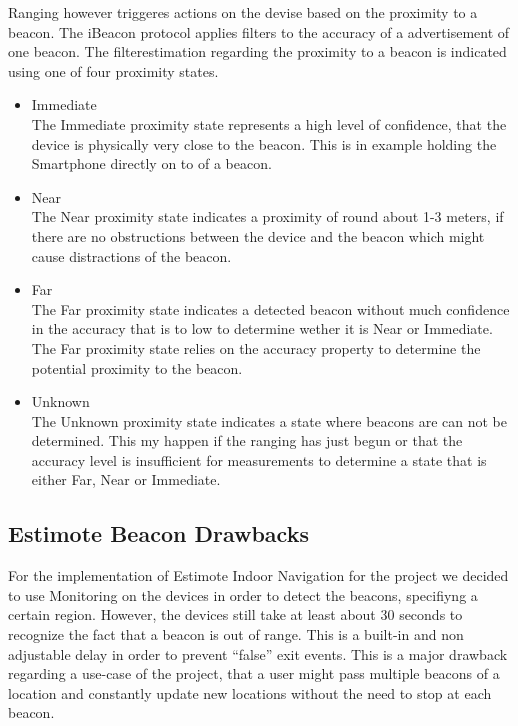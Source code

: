 Ranging however triggeres actions on the devise based on the proximity to a beacon.
The iBeacon protocol applies filters to the accuracy of a advertisement of one beacon. The filterestimation regarding the proximity to a beacon is indicated using one of four proximity states.

\begin{itemize}

    \item Immediate\\
    The Immediate proximity state represents a high level of confidence, that the device is physically very close to the beacon. This is in example holding the Smartphone directly on to of a beacon.
    \item Near\\
    The Near proximity state indicates a proximity of round about 1-3 meters, if there are no obstructions between the device and the beacon which might cause distractions of the beacon.
    \item Far\\
    The Far proximity state indicates a detected beacon without much confidence in the accuracy that is to low to determine wether it is Near or Immediate. The Far proximity state relies on the accuracy property to determine the potential proximity to the beacon.
    \item Unknown\\
    The Unknown proximity state indicates a state where beacons are can not be determined. This my happen if the ranging has just begun or that the accuracy level is insufficient for measurements to determine a state that is either Far, Near or Immediate.
\end{itemize}

\subsection{Estimote Beacon Drawbacks}

For the implementation of Estimote Indoor Navigation for the project we decided to use Monitoring on the devices in order to detect the beacons, specifiyng a certain region. However, the devices still take at least about 30 seconds to recognize the fact that a beacon is out of range. This is a  built-in and non adjustable delay in order to prevent \enquote{false} exit events.\cite{developerDocsEstimote} This is a major drawback regarding a use-case of the project, that a user might pass multiple beacons of a location and constantly update new locations without the need to stop at each beacon.

